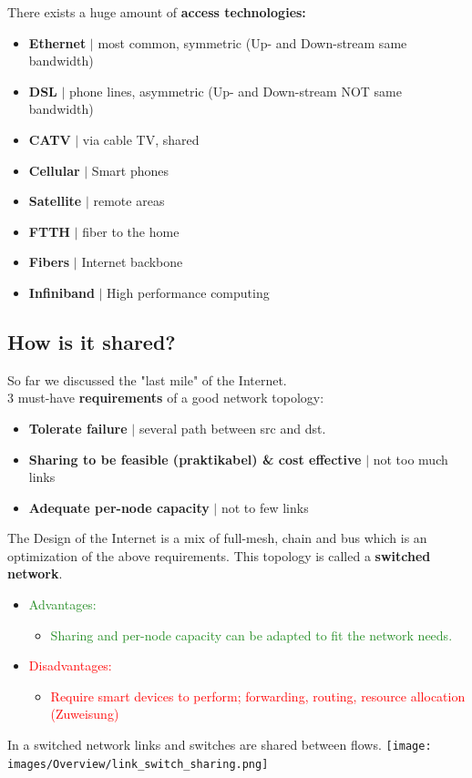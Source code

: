 \documentclass[a4paper, fontsize=8pt, landscape, DIV=1]{scrartcl}
\begin{document}
\begin{multicols*}{4}
		There exists a huge amount of \textbf{access technologies: }
		\begin{itemize}[noitemsep]
			\item \textbf{Ethernet} $\vert$ most common, symmetric (Up- and Down-stream
			same bandwidth)
			\item \textbf{DSL} $\vert$ phone lines, asymmetric (Up- and Down-stream NOT
			same bandwidth)
			\item \textbf{CATV} $\vert$ via cable TV, shared
			\item \textbf{Cellular} $\vert$ Smart phones 
			\item \textbf{Satellite} $\vert$ remote areas
			\item \textbf{FTTH} $\vert$ fiber to the home
			\item \textbf{Fibers} $\vert$ Internet backbone 
			\item \textbf{Infiniband} $\vert$ High performance computing 
		\end{itemize}
		\subsection{How is it shared?}
		So far we discussed the "last mile" of the Internet.\\
		3 must-have \textbf{requirements} of a good network topology: 
		\begin{itemize}
			\item \textbf{Tolerate failure} $\vert$ several path between src and dst.
			\item \textbf{Sharing to be feasible (praktikabel) \& cost effective }
			$\vert$ not too much links 
			\item \textbf{Adequate per-node capacity} $\vert$ not to few links 
		\end{itemize}
		The Design of the Internet is a mix of full-mesh, chain and bus which is an
		optimization of the above requirements. This topology is called a
		\textbf{switched network}.
		\vspace{-0.5cm}
		\begin{itemize}[noitemsep,topsep=0pt]
			\item \textcolor{ForestGreen}{Advantages:}
			\begin{itemize}
				\item \textcolor{ForestGreen}{Sharing and per-node capacity can be adapted
					to fit the network needs.}
			\end{itemize} 
			\item \textcolor{Red}{Disadvantages:}
			\begin{itemize}
				\item \textcolor{Red}{Require smart devices to perform; forwarding,
					routing, resource allocation (Zuweisung) }
			\end{itemize} 
		\end{itemize} 
		In a switched network links and switches are shared between flows.
		\texttt{[image: images/Overview/link\_switch\_sharing.png]}
		\columnbreak
		

\end{multicols*}
\end{document}
